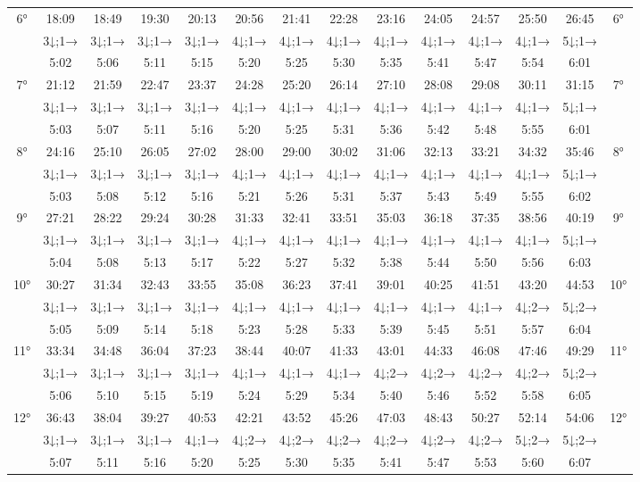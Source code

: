 \begin{scriptsize}
\begin{tabular}{c || c | c | c | c | c | c | c | c | c | c | c | c || c}
		\multirow{3}{*}{6°}&18:09&18:49&19:30&20:13&20:56&21:41&22:28&23:16&24:05&24:57&25:50&26:45&\multirow{3}{*}{6°}\\ \space&3↓;1→&3↓;1→&3↓;1→&3↓;1→&4↓;1→&4↓;1→&4↓;1→&4↓;1→&4↓;1→&4↓;1→&4↓;1→&5↓;1→&\space\\&5:02&5:06&5:11&5:15&5:20&5:25&5:30&5:35&5:41&5:47&5:54&6:01&\space\\\hline
		\multirow{3}{*}{7°}&21:12&21:59&22:47&23:37&24:28&25:20&26:14&27:10&28:08&29:08&30:11&31:15&\multirow{3}{*}{7°}\\ \space&3↓;1→&3↓;1→&3↓;1→&3↓;1→&4↓;1→&4↓;1→&4↓;1→&4↓;1→&4↓;1→&4↓;1→&4↓;1→&5↓;1→&\space\\&5:03&5:07&5:11&5:16&5:20&5:25&5:31&5:36&5:42&5:48&5:55&6:01&\space\\\hline
		\multirow{3}{*}{8°}&24:16&25:10&26:05&27:02&28:00&29:00&30:02&31:06&32:13&33:21&34:32&35:46&\multirow{3}{*}{8°}\\ \space&3↓;1→&3↓;1→&3↓;1→&3↓;1→&4↓;1→&4↓;1→&4↓;1→&4↓;1→&4↓;1→&4↓;1→&4↓;1→&5↓;1→&\space\\&5:03&5:08&5:12&5:16&5:21&5:26&5:31&5:37&5:43&5:49&5:55&6:02&\space\\\hline
		\multirow{3}{*}{9°}&27:21&28:22&29:24&30:28&31:33&32:41&33:51&35:03&36:18&37:35&38:56&40:19&\multirow{3}{*}{9°}\\ \space&3↓;1→&3↓;1→&3↓;1→&3↓;1→&4↓;1→&4↓;1→&4↓;1→&4↓;1→&4↓;1→&4↓;1→&4↓;1→&5↓;1→&\space\\&5:04&5:08&5:13&5:17&5:22&5:27&5:32&5:38&5:44&5:50&5:56&6:03&\space\\\hline
		\multirow{3}{*}{10°}&30:27&31:34&32:43&33:55&35:08&36:23&37:41&39:01&40:25&41:51&43:20&44:53&\multirow{3}{*}{10°}\\ \space&3↓;1→&3↓;1→&3↓;1→&3↓;1→&4↓;1→&4↓;1→&4↓;1→&4↓;1→&4↓;1→&4↓;1→&4↓;2→&5↓;2→&\space\\&5:05&5:09&5:14&5:18&5:23&5:28&5:33&5:39&5:45&5:51&5:57&6:04&\space\\\hline
		\multirow{3}{*}{11°}&33:34&34:48&36:04&37:23&38:44&40:07&41:33&43:01&44:33&46:08&47:46&49:29&\multirow{3}{*}{11°}\\ \space&3↓;1→&3↓;1→&3↓;1→&3↓;1→&4↓;1→&4↓;1→&4↓;1→&4↓;2→&4↓;2→&4↓;2→&4↓;2→&5↓;2→&\space\\&5:06&5:10&5:15&5:19&5:24&5:29&5:34&5:40&5:46&5:52&5:58&6:05&\space\\\hline
		\multirow{3}{*}{12°}&36:43&38:04&39:27&40:53&42:21&43:52&45:26&47:03&48:43&50:27&52:14&54:06&\multirow{3}{*}{12°}\\ \space&3↓;1→&3↓;1→&3↓;1→&4↓;1→&4↓;2→&4↓;2→&4↓;2→&4↓;2→&4↓;2→&4↓;2→&5↓;2→&5↓;2→&\space\\&5:07&5:11&5:16&5:20&5:25&5:30&5:35&5:41&5:47&5:53&5:60&6:07&\space\\\hline

\end{tabular}
\end{scriptsize}
